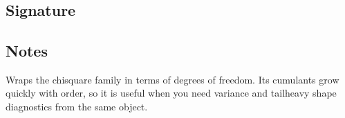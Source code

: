\documentclass[letterpaper,10pt,english]{sphinxmanual}
\begin{document}
\section{}
\label{\detokenize{object_api_reference:chisquare}}

\subsection{Signature}
\label{\detokenize{object_api_reference:id19}}
\begin{sphinxVerbatim}[commandchars=\\\{\}]

\end{sphinxVerbatim}


\subsection{Notes}
\label{\detokenize{object_api_reference:id20}}
\sphinxAtStartPar
Wraps the chi\sphinxhyphen{}square family in terms of degrees of freedom. Its cumulants grow quickly with order, so it is useful when you need variance and tail\sphinxhyphen{}heavy shape diagnostics from the same object.
\end{document}
